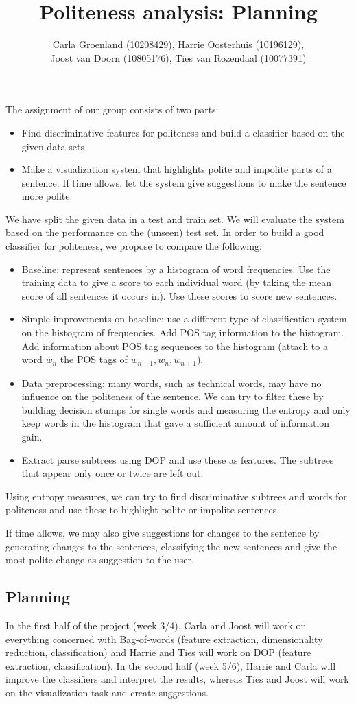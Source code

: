 \documentclass[11pt, english]{article}
\title{Politeness analysis: Planning}
\author{Carla Groenland (10208429), Harrie Oosterhuis (10196129), \\
Joost van Doorn (10805176), Ties van Rozendaal (10077391)}
\begin{document}
\maketitle
\noindent The assignment of our group consists of two parts:
\begin{itemize}
\item Find discriminative features for politeness and build a classifier based on the given data sets
\item Make a visualization system that highlights polite and impolite parts of a sentence. If time allows, let the system give suggestions to make the sentence more polite.
\end{itemize}
We have split the given data in a test and train set. We will evaluate the system based on the performance on the (unseen) test set.
In order to build a good classifier for politeness, we propose to compare the following:
\begin{itemize}
\item Baseline: represent sentences by a histogram of word frequencies. Use the training data to give a score to each individual word (by taking the mean score of all sentences it occurs in). Use these scores to score new sentences. 
\item Simple improvements on baseline: use a different type of classification system on the histogram of frequencies. Add POS tag information to the histogram. Add information about POS tag sequences to the histogram (attach to a word $w_n$ the POS tags of $w_{n-1},w_n,w_{n+1}$).
\item Data preprocessing: many words, such as technical words, may have no influence on the politeness of the sentence. We can try to filter these by building decision stumps for single words and measuring the entropy and only keep words in the histogram that gave a sufficient amount of information gain.
\item Extract parse subtrees using DOP and use these as features. The subtrees that appear only once or twice are left out. 
\end{itemize}
Using entropy measures, we can try to find discriminative subtrees and words for politeness and use these to highlight polite or impolite sentences. 

If time allows, we may also give suggestions for changes to the sentence by generating changes to the sentences, classifying the new sentences and give the most polite change as suggestion to the user.

\subsection*{Planning}
In the first half of the project (week 3/4), Carla and Joost will work on everything concerned with Bag-of-words (feature extraction, dimensionality reduction, classification) and Harrie and Ties will work on DOP (feature extraction, classification). In the second half (week 5/6), Harrie and Carla will improve the classifiers and interpret the results, whereas Ties and Joost will work on the visualization task and create suggestions.  
\end{document}

